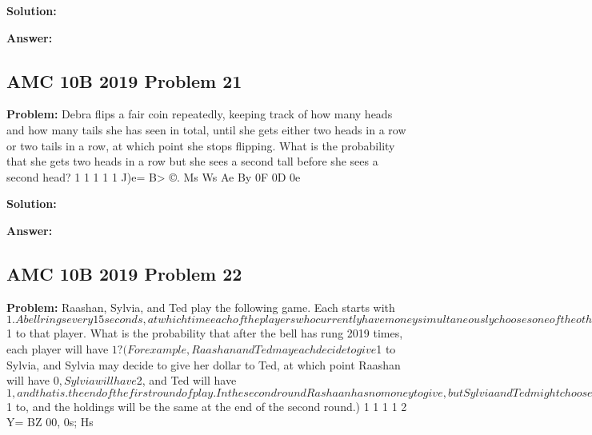 \documentclass{article}
\newenvironment{problem}{\textbf{Problem: }}{\\}
\newenvironment{solution}{\textbf{Solution: }}{\\}
\newenvironment{answer}{\textbf{Answer: }}{\\}
\begin{document}
\begin{solution}
\end{solution}

\begin{answer}
\end{answer}

\subsection{AMC 10B 2019 Problem 21}

\begin{problem}
Debra flips a fair coin repeatedly, keeping track of how many heads and how many tails she has seen in total, until she gets either two heads in a row or two tails in a row, at which point she stops flipping. What is the probability that she gets two heads in a row but she sees a second tall before she sees a second head? 1 1 1 1 1 J)e= B> ©. Ms Ws Ae By 0F 0D 0e
\end{problem}

\begin{solution}
\end{solution}

\begin{answer}
\end{answer}

\subsection{AMC 10B 2019 Problem 22}

\begin{problem}
Raashan, Sylvia, and Ted play the following game. Each starts with $1. A bell rings every 15 seconds, at which time each of the players who currently have money simultaneously chooses one of the other two players independently and at random and gives $1 to that player. What is the probability that after the bell has rung 2019 times, each player will have $1? (For example, Raashan and Ted may each decide to give $1 to Sylvia, and Sylvia may decide to give her dollar to Ted, at which point Raashan will have $0, Sylvia will have $2, and Ted will have $1, and that is. the end of the first round of play. In the second round Rashaan has no money to give, but Sylvia and Ted might choose each other to give their $1 to, and the holdings will be the same at the end of the second round.) 1 1 1 1 2 Y= BZ 00, 0s; Hs
\end{problem}
\end{document}

